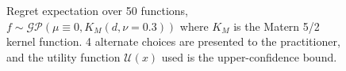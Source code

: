 \documentclass[
  letterpaper,
  DIV=11,
  numbers=noendperiod,
  oneside]{scrartcl}
\begin{document}
\begin{figure}

\begin{minipage}[t]{\linewidth}

{\centering 


}

\end{minipage}%
\newline
\begin{minipage}[t]{\linewidth}

{\centering 


}

\end{minipage}%

\caption{\label{fig-res}Regret expectation over 50 functions,
\(f \sim \mathcal{GP}(\mu \equiv 0, K_M (d,\nu = 0.3))\) where \(K_M\)
is the Mat\textquotesingle ern 5/2 kernel function. 4 alternate choices
are presented to the practitioner, and the utility function
\(\mathcal{U}(x)\) used is the upper-confidence bound.}

\end{figure}
\end{document}
